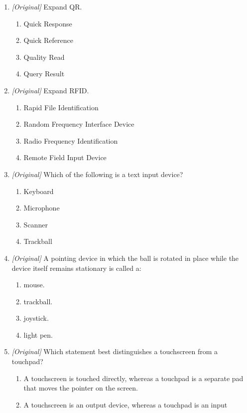 \begin{enumerate}[label=\textbf{Q\arabic*.}, leftmargin=*]
\item \textit{[Original]} Expand QR.
  \begin{enumerate}[label=\Alph*.]
    \item Quick Response
    \item Quick Reference
    \item Quality Read
    \item Query Result
  \end{enumerate}
\item \textit{[Original]} Expand RFID.
  \begin{enumerate}[label=\Alph*.]
    \item Rapid File Identification
    \item Random Frequency Interface Device
    \item Radio Frequency Identification
    \item Remote Field Input Device
  \end{enumerate}
\item \textit{[Original]} Which of the following is a text input device?
  \begin{enumerate}[label=\Alph*.]
    \item Keyboard
    \item Microphone
    \item Scanner
    \item Trackball
  \end{enumerate}
\item \textit{[Original]} A pointing device in which the ball is rotated in
  place while the device itself remains stationary is called a:
  \begin{enumerate}[label=\Alph*.]
    \item mouse.
    \item trackball.
    \item joystick.
    \item light pen.
  \end{enumerate}
\item \textit{[Original]} Which statement best distinguishes a touchscreen
  from a touchpad?
  \begin{enumerate}[label=\Alph*.]
    \item A touchscreen is touched directly, whereas a touchpad is a separate
      pad that moves the pointer on the screen.
    \item A touchscreen is an output device, whereas a touchpad is an input

\end{enumerate}
\end{enumerate}
